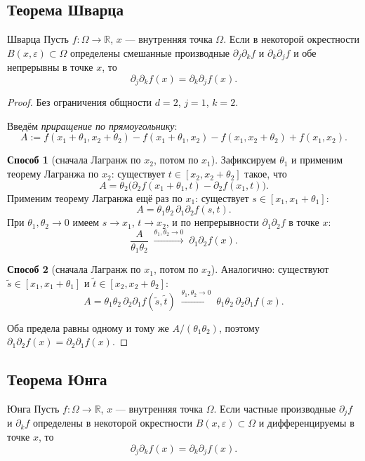 \subsection{Теорема Шварца}

\begin{Theorem}{Шварца}{}
	Пусть $f\colon\Omega\to\mathbb{R}$, $x$ --- внутренняя точка $\Omega$.
	Если в некоторой окрестности $B(x,\varepsilon)\subset\Omega$ определены смешанные
	производные $\partial_j\partial_k f$ и $\partial_k\partial_j f$ и обе непрерывны
	в точке $x$, то
	\[
	\partial_j\partial_k f(x)=\partial_k\partial_j f(x).
	\]
\end{Theorem}

\begin{proof}
	Без ограничения общности $d=2$, $j=1$, $k=2$.
	
	Введём \emph{приращение по прямоугольнику}:
	\[
	A := f(x_1+\theta_1,x_2+\theta_2)
	- f(x_1+\theta_1,x_2)
	- f(x_1,x_2+\theta_2)
	+ f(x_1,x_2).
	\]
	
	\textbf{Способ 1} (сначала Лагранж по $x_2$, потом по $x_1$).
	Зафиксируем $\theta_1$ и применим теорему Лагранжа по $x_2$:
	существует $t\in[x_2,x_2+\theta_2]$ такое, что
	\[
	A = \theta_2\bigl(\partial_2 f(x_1+\theta_1,t)-\partial_2 f(x_1,t)\bigr).
	\]
	Применим теорему Лагранжа ещё раз по $x_1$: существует $s\in[x_1,x_1+\theta_1]$:
	\[
	A = \theta_1\theta_2\,\partial_1\partial_2 f(s,t).
	\]
	При $\theta_1,\theta_2\to0$ имеем $s\to x_1$, $t\to x_2$, и по непрерывности
	$\partial_1\partial_2 f$ в точке $x$:
	\[
	\frac{A}{\theta_1\theta_2}\;\xrightarrow{\theta_1,\theta_2\to0}\;\partial_1\partial_2 f(x).
	\]
	
	\textbf{Способ 2} (сначала Лагранж по $x_1$, потом по $x_2$).
	Аналогично: существуют $\tilde{s}\in[x_1,x_1+\theta_1]$ и $\tilde{t}\in[x_2,x_2+\theta_2]$:
	\[
	A = \theta_1\theta_2\,\partial_2\partial_1 f(\tilde{s},\tilde{t})
	\;\xrightarrow{\theta_1,\theta_2\to0}\;
	\theta_1\theta_2\,\partial_2\partial_1 f(x).
	\]
	
	Оба предела равны одному и тому же $A/(\theta_1\theta_2)$, поэтому
	$\partial_1\partial_2 f(x)=\partial_2\partial_1 f(x)$.
\end{proof}

\subsection{Теорема Юнга}

\begin{Theorem}{Юнга}{}
	Пусть $f\colon\Omega\to\mathbb{R}$, $x$ --- внутренняя точка $\Omega$.
	Если частные производные $\partial_j f$ и $\partial_k f$ определены в некоторой
	окрестности $B(x,\varepsilon)\subset\Omega$ и дифференцируемы в точке $x$, то
	\[
	\partial_j\partial_k f(x)=\partial_k\partial_j f(x).
	\]
\end{Theorem}

